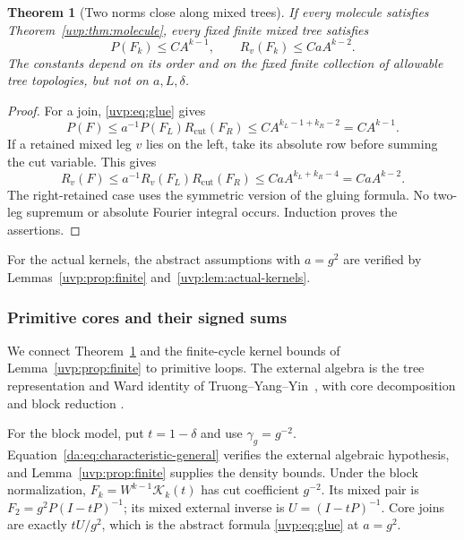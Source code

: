 \documentclass[11pt]{article}
\numberwithin{equation}{section}
\newtheorem{theorem}{Theorem}[section]
\theoremstyle{remark}
\begin{document}
\begin{theorem}[Two norms close along mixed trees]\label{uvp:thm:tree}
If every molecule satisfies Theorem~\ref{uvp:thm:molecule}, every fixed
finite mixed tree satisfies
\[
 P(F_k)\le CA^{k-1},\qquad R_v(F_k)\le CaA^{k-2}.
\]
The constants depend on its order and on the fixed finite collection
of allowable tree topologies, but not on $a,L,\delta$.
\end{theorem}
\begin{proof}
For a join, \eqref{uvp:eq:glue} gives
\[
 P(F)\le a^{-1}P(F_L)R_{\mathrm{cut}}(F_R)
       \le C A^{k_L-1+k_R-2}=CA^{k-1}.
\]
If a retained mixed leg $v$ lies on the left, take its absolute row
before summing the cut variable. This gives
\[
 R_v(F)\le a^{-1}R_v(F_L)R_{\mathrm{cut}}(F_R)
          \le CaA^{k_L+k_R-4}=CaA^{k-2}.
\]
The right-retained case uses the symmetric version of the gluing
formula. No two-leg supremum or absolute Fourier integral occurs.
Induction proves the assertions.
\end{proof}

For the actual kernels, the abstract assumptions with $a=g^2$ are
verified by Lemmas~\ref{uvp:prop:finite} and~\ref{uvp:lem:actual-kernels}.

\subsubsection{Primitive cores and their signed sums}
We connect Theorem~\ref{uvp:thm:tree} and the finite-cycle kernel bounds of
Lemma~\ref{uvp:prop:finite} to primitive loops.
The external algebra is the tree representation and
Ward identity of Truong--Yang--Yin~\cite[Assumption 4.1, Lemma 4.16,
Corollary 4.21]{TYY}, with core decomposition
\cite[Definition 4.24 and Lemma 4.25, equation (4.34)]{TYY} and
block reduction \cite[Lemma 4.26, equation (4.38)]{TYY}.

For the block model, put $t=1-\delta$ and use $\gamma_g=g^{-2}$.
Equation~\eqref{da:eq:characteristic-general} verifies the external algebraic
hypothesis, and Lemma~\ref{uvp:prop:finite} supplies the density bounds. Under the block normalization,
$F_k=W^{k-1}\mathcal K_k(t)$ has cut coefficient $g^{-2}$.
Its mixed pair is $F_2=g^2P(I-tP)^{-1}$; its mixed external inverse
is $U=(I-tP)^{-1}$. Core joins are exactly $tU/g^2$, which is
the abstract formula \eqref{uvp:eq:glue} at $a=g^2$.
\end{document}
